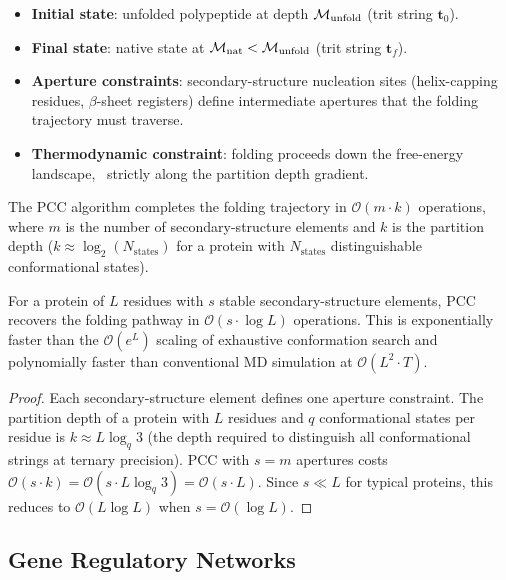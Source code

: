 \begin{itemize}[noitemsep]
    \item \textbf{Initial state}: unfolded polypeptide at depth
          $\mathcal{M}_\mathrm{unfold}$ (trit string $\mathbf{t}_0$).
    \item \textbf{Final state}: native state at $\mathcal{M}_\mathrm{nat} <
          \mathcal{M}_\mathrm{unfold}$ (trit string $\mathbf{t}_f$).
    \item \textbf{Aperture constraints}: secondary-structure nucleation sites
          (helix-capping residues, $\beta$-sheet registers) define
          intermediate apertures that the folding trajectory must traverse.
    \item \textbf{Thermodynamic constraint}: folding proceeds down the
          free-energy landscape, \ie\ strictly along the partition depth
          gradient.
\end{itemize}

The PCC algorithm completes the folding trajectory in $\mathcal{O}(m \cdot k)$
operations, where $m$ is the number of secondary-structure elements and $k$ is
the partition depth ($k \approx \log_2(N_\mathrm{states})$ for a protein with
$N_\mathrm{states}$ distinguishable conformational states).

\begin{proposition}
\label{prop:folding-pcc}
For a protein of $L$ residues with $s$ stable secondary-structure elements,
PCC recovers the folding pathway in $\mathcal{O}(s \cdot \log L)$ operations.
This is exponentially faster than the $\mathcal{O}(e^{L})$ scaling of
exhaustive conformation search and polynomially faster than conventional
MD simulation at $\mathcal{O}(L^2 \cdot T)$.
\end{proposition}

\begin{proof}
Each secondary-structure element defines one aperture constraint.  The
partition depth of a protein with $L$ residues and $q$ conformational states
per residue is $k \approx L\log_q 3$ (the depth required to distinguish all
conformational strings at ternary precision).  PCC with $s = m$ apertures costs
$\mathcal{O}(s \cdot k) = \mathcal{O}(s \cdot L\log_q 3) = \mathcal{O}(s \cdot L)$.
Since $s \ll L$ for typical proteins, this reduces to $\mathcal{O}(L\log L)$
when $s = \mathcal{O}(\log L)$.
\end{proof}

\subsection{Gene Regulatory Networks}

